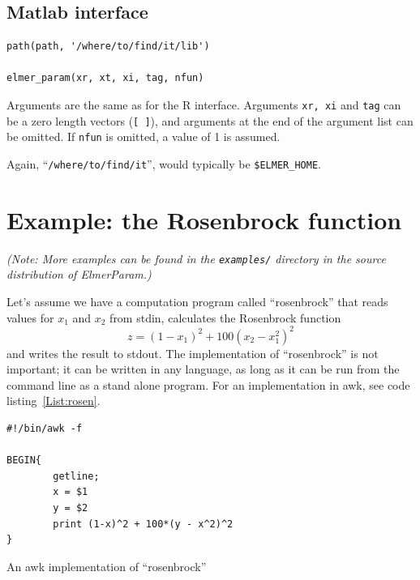 \documentclass[12pt,a4paper]{article}
\newcommand{\code}[1]{\texttt{#1}}
\begin{document}
\subsection{Matlab interface}

\begin{verbatim}
path(path, '/where/to/find/it/lib')

elmer_param(xr, xt, xi, tag, nfun)
\end{verbatim}
Arguments are the same as for the R interface.  Arguments \code{xr, xi} and
\code{tag} can be a zero length vectors (\code{[ ]}), and arguments at the
end of the argument list can be omitted. If \code{nfun} is
omitted, a value of 1 is assumed.

Again, ``\code{/where/to/find/it}'', would typically be
\code{\${ELMER\_HOME}}.




\section{Example: the Rosenbrock function}

{\it
(Note: More examples can be found in the \texttt{examples/} directory in
the source distribution of ElmerParam.)
}

\vspace{2ex}

\noindent Let's assume we have a computation program called ``rosenbrock'' that reads
values for $x_1$ and $x_2$ from stdin, calculates the Rosenbrock function
\[
    z = (1 - x_1)^2 + 100(x_2 - x_1^2)^2
\]
and writes the result to stdout.  The implementation of
``rosenbrock'' is not important; it can be written in any language, as long
as it can be run from the command line as a stand alone program.  For an
implementation in awk, see code listing~\ref{List:rosen}.
\begin{listing}
\begin{verbatim}
#!/bin/awk -f

BEGIN{ 
        getline;
        x = $1
        y = $2
        print (1-x)^2 + 100*(y - x^2)^2
}
\end{verbatim}
\caption{An awk implementation of ``rosenbrock''}\label{List:rosen}
\end{listing}
\end{document}
